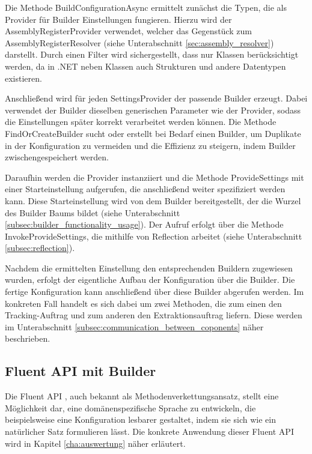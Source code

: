 Die Methode BuildConfigurationAsync ermittelt zunächst die Typen, die als Provider für Builder Einstellungen fungieren. Hierzu wird der AssemblyRegisterProvider verwendet, welcher das Gegenstück zum AssemblyRegisterResolver (siehe Unterabschnitt \ref{sec:assembly_resolver}) darstellt. Durch einen Filter wird sichergestellt, dass nur Klassen berücksichtigt werden, da in .NET neben Klassen auch Strukturen und andere Datentypen existieren.

Anschließend wird für jeden SettingsProvider der passende Builder erzeugt. Dabei verwendet der Builder dieselben generischen Parameter wie der Provider, sodass die Einstellungen später korrekt verarbeitet werden können. Die Methode FindOrCreateBuilder sucht oder erstellt bei Bedarf einen Builder, um Duplikate in der Konfiguration zu vermeiden und die Effizienz zu steigern, indem Builder zwischengespeichert werden.

Daraufhin werden die Provider instanziiert und die Methode ProvideSettings mit einer Starteinstellung aufgerufen, die anschließend weiter spezifiziert werden kann. Diese Starteinstellung wird von dem Builder bereitgestellt, der die Wurzel des Builder Baums bildet (siehe Unterabschnitt \ref{subsec:builder_functionality_usage}). Der Aufruf erfolgt über die Methode InvokeProvideSettings, die mithilfe von Reflection arbeitet (siehe Unterabschnitt \ref{subsec:reflection}).

Nachdem die ermittelten Einstellung den entsprechenden Buildern zugewiesen wurden, erfolgt der eigentliche Aufbau der Konfiguration über die Builder. Die fertige Konfiguration kann anschließend über diese Builder abgerufen werden. Im konkreten Fall handelt es sich dabei um zwei Methoden, die zum einen den Tracking-Auftrag und zum anderen den Extraktionsauftrag liefern. Diese werden im Unterabschnitt \ref{subsec:communication_between_coponents} näher beschrieben.

\subsection{Fluent API mit Builder}
\label{subsec:builder_implementation}

Die Fluent API \cite{Fowler2005FluentInterface}, auch bekannt als Methodenverkettungsansatz, stellt eine Möglichkeit dar, eine domänenspezifische Sprache zu entwickeln, die beispielsweise eine Konfiguration lesbarer gestaltet, indem sie sich wie ein natürlicher Satz formulieren lässt. Die konkrete Anwendung dieser Fluent API wird in Kapitel \ref{cha:auswertung} näher erläutert.

